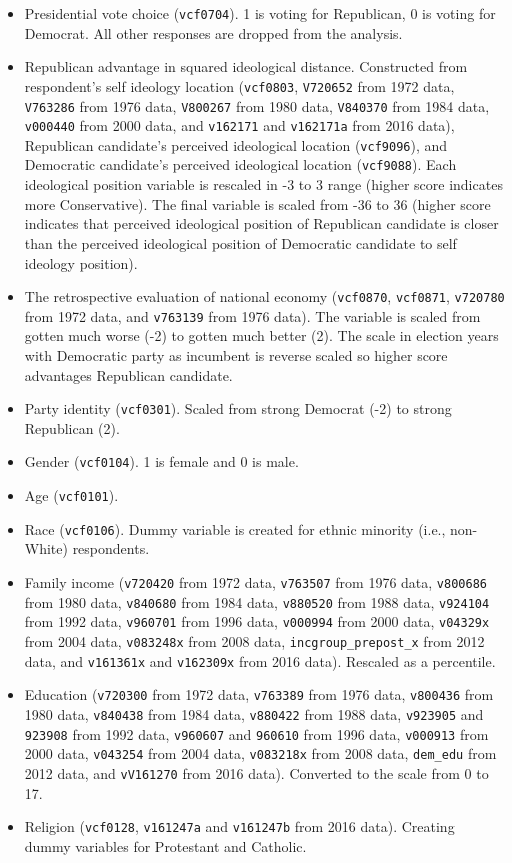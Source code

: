 \begin{itemize}
    \item Presidential vote choice (\texttt{vcf0704}). 1 is voting for Republican, 0 is voting for Democrat. All other responses are dropped from the analysis.
    \item Republican advantage in squared ideological distance. Constructed from respondent's self ideology location (\texttt{vcf0803}, \texttt{V720652} from 1972 data, \texttt{V763286} from 1976 data, \texttt{V800267} from 1980 data, \texttt{V840370} from 1984 data, \texttt{v000440} from 2000 data, and \texttt{v162171} and \texttt{v162171a} from 2016 data), Republican candidate's perceived ideological location (\texttt{vcf9096}), and Democratic candidate's perceived ideological location (\texttt{vcf9088}). Each ideological position variable is rescaled in -3 to 3 range (higher score indicates more Conservative). The final variable is scaled from -36 to 36 (higher score indicates that perceived ideological position of Republican candidate is closer than the perceived ideological position of Democratic candidate to self ideology position).
    \item The retrospective evaluation of national economy (\texttt{vcf0870}, \texttt{vcf0871}, \texttt{v720780} from 1972 data, and \texttt{v763139} from 1976 data). The variable is scaled from gotten much worse (-2) to gotten much better (2). The scale in election years with Democratic party as incumbent is reverse scaled so higher score advantages Republican candidate. 
    \item Party identity (\texttt{vcf0301}). Scaled from strong Democrat (-2) to strong Republican (2).
    \item Gender (\texttt{vcf0104}). 1 is female and 0 is male.
    \item Age (\texttt{vcf0101}).
    \item Race (\texttt{vcf0106}). Dummy variable is created for ethnic minority (i.e., non-White) respondents.
    \item Family income (\texttt{v720420} from 1972 data, \texttt{v763507} from 1976 data, \texttt{v800686} from 1980 data, \texttt{v840680} from 1984 data, \texttt{v880520} from 1988 data, \texttt{v924104} from 1992 data, \texttt{v960701} from 1996 data, \texttt{v000994} from 2000 data, \texttt{v04329x} from 2004 data, \texttt{v083248x} from 2008 data, \texttt{incgroup\_prepost\_x} from 2012 data, and \texttt{v161361x} and \texttt{v162309x} from 2016 data). Rescaled as a percentile.
    \item Education (\texttt{v720300} from 1972 data, \texttt{v763389} from 1976 data, \texttt{v800436} from 1980 data, \texttt{v840438} from 1984 data, \texttt{v880422} from 1988 data, \texttt{v923905} and \texttt{923908} from 1992 data, \texttt{v960607} and \texttt{960610} from 1996 data, \texttt{v000913} from 2000 data, \texttt{v043254} from 2004 data, \texttt{v083218x} from 2008 data, \texttt{dem\_edu} from 2012 data, and \texttt{vV161270} from 2016 data). Converted to the scale from 0 to 17.
    \item Religion (\texttt{vcf0128}, \texttt{v161247a} and \texttt{v161247b} from 2016 data). Creating dummy variables for Protestant and Catholic.
\end{itemize}

